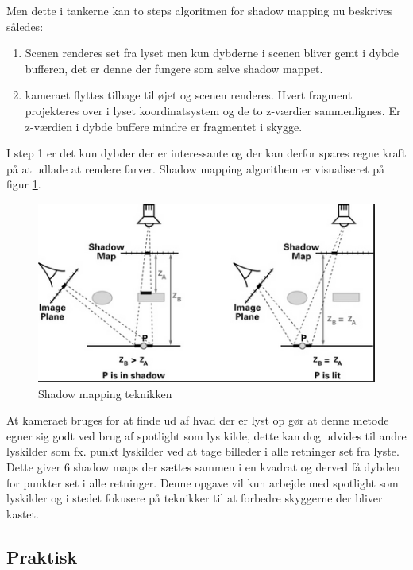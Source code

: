 \documentclass[11pt,a4paper]{article}
\begin{document}
Men dette i tankerne kan to steps algoritmen for shadow mapping nu beskrives således:
\begin{enumerate}
\item Scenen renderes set fra lyset men kun dybderne i scenen bliver gemt i dybde bufferen, det er denne der fungere som selve shadow mappet.
\item kameraet flyttes tilbage til øjet og scenen renderes. Hvert fragment projekteres over i lyset koordinatsystem og de to z-værdier sammenlignes. Er z-værdien i dybde buffere mindre er fragmentet i skygge.
\end{enumerate}

I step 1 er det kun dybder der er interessante og der kan derfor spares regne kraft på at udlade at rendere farver. Shadow mapping algorithem er visualiseret på figur \ref{shadowmapdesc}.


\begin{figure}[ht!]
\centering
\includegraphics[width=140mm]{img/2.png}
\caption{Shadow mapping teknikken}
\label{shadowmapdesc}
\end{figure}


At kameraet bruges for at finde ud af hvad der er lyst op gør at denne metode egner sig godt ved brug af spotlight som lys kilde, dette kan dog udvides til andre lyskilder som fx. punkt lyskilder ved at tage billeder i alle retninger set fra lyste. Dette giver 6 shadow maps der sættes sammen i en kvadrat og derved få dybden for punkter set i alle retninger. Denne opgave vil kun arbejde med spotlight som lyskilder og i stedet fokusere på teknikker til at forbedre skyggerne der bliver kastet.  


\subsection{Praktisk}
\end{document}
